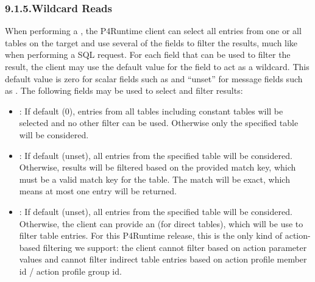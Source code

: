 \documentclass[11pt]{article}
\begin{document}
{%
\subsubsection{9.1.5.\hspace*{0.5em}Wildcard Reads}\label{sec-table-wildcard-reads}%

\noindent{}When performing a , the P4Runtime client can select all entries
from one or all tables on the target and use several of the  fields
to filter the results, much like when performing a SQL request. For each field
that can be used to filter the result, the client may use the default value for
the field to act as a wildcard. This default value is zero for scalar fields
such as  and \textquotedblleft{}unset\textquotedblright{} for message fields such as . The following
fields may be used to select and filter results:%

\begin{itemize}[noitemsep,topsep=\mdcompacttopsep]%

\item{}: If default (0), entries from all tables \textemdash{} including constant
tables \textemdash{} will be selected and no other filter can be used. Otherwise only
the specified table will be considered.%

\item{}: If default (unset), all entries from the specified table will be
considered. Otherwise, results will be filtered based on the provided match
key, which must be a valid match key for the table. The match will be exact,
which means at most one entry will be returned.%

\item{}: If default (unset), all entries from the specified table will be
considered. Otherwise, the client can provide an  (for direct
tables), which will be use to filter table entries. For this P4Runtime
release, this is the only kind of action-based filtering we support: the
client cannot filter based on action parameter values and cannot filter
indirect table entries based on action profile member id / action profile
group id.%


\end{itemize}}
\end{document}
